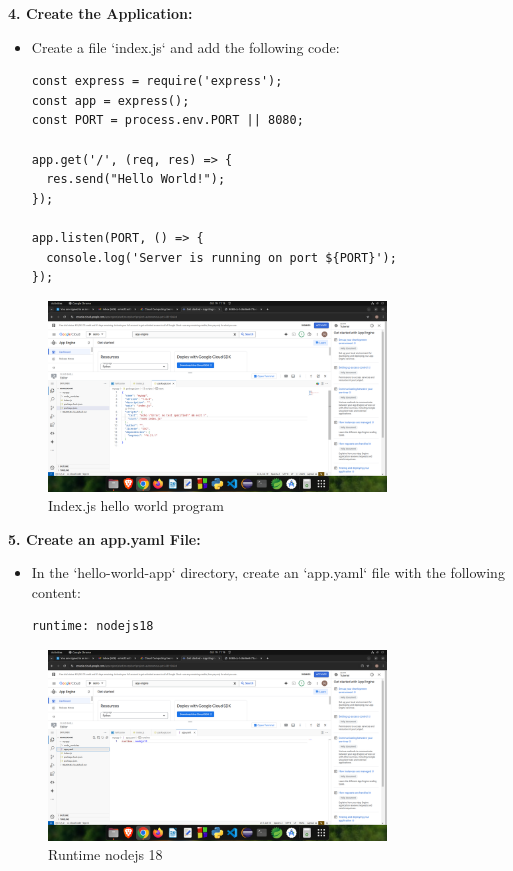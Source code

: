 \documentclass[12pt]{article}
\begin{document}
\begin{spacing}{1.5}
\begin{adjustwidth}{0cm}{0cm}
\begin{justify}
\textbf{4. Create the Application:}
\begin{itemize}
    \item Create a file ‘index.js‘ and add the following code:
    \begin{center}
    \begin{verbatim}
const express = require('express');
const app = express();
const PORT = process.env.PORT || 8080;

app.get('/', (req, res) => {
  res.send("Hello World!");
});

app.listen(PORT, () => {
  console.log('Server is running on port ${PORT}');
});
    \end{verbatim}
    \end{center}
\end{itemize}

\begin{figure}[H]
    \centering
    \includegraphics[width=0.8\textwidth]{exp 5/s22.png}
    \caption{Index.js hello world program}
    \label{fig: 1}
\end{figure}

\textbf{5. Create an app.yaml File:}
\begin{itemize}
    \item In the ‘hello-world-app‘ directory, create an ‘app.yaml‘ file with the following content:
    \begin{center}
    \begin{verbatim}
runtime: nodejs18
    \end{verbatim}
    \end{center}
\end{itemize}

\begin{figure}[H]
    \centering
    \includegraphics[width=0.8\textwidth]{exp 5/s23.png}
    \caption{Runtime nodejs 18}
    \label{fig: 1}
\end{figure}



\end{justify}
\end{adjustwidth}
\end{spacing}
\end{document}
